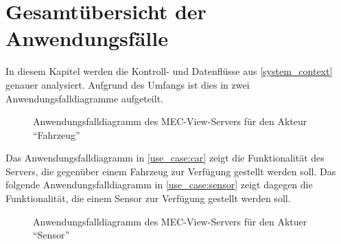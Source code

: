 \section{Gesamtübersicht der Anwendungsfälle}

In diesem Kapitel werden die Kontroll- und Datenflüsse aus \autoref{system_context} genauer analysiert.
Aufgrund des Umfangs ist dies in zwei Anwendungsfalldiagramme aufgeteilt.

\begin{figure}[H]
	\centering
	\caption{Anwendungsfalldiagramm des MEC-View-Servers für den Akteur \enquote{Fahrzeug}}
	\label{use_case:car}
\end{figure}

Das Anwendungsfalldiagramm in \autoref{use_case:car} zeigt die Funktionalität des Servers, die gegenüber einem Fahrzeug zur Verfügung gestellt werden soll.
Das folgende Anwendungsfalldiagramm in \autoref{use_case:sensor} zeigt dagegen die Funktionalität, die einem Sensor zur Verfügung gestellt werden soll.

\begin{figure}[H]
	\centering
	\caption{Anwendungsfalldiagramm des MEC-View-Servers für den Aktuer \enquote{Sensor}}
	\label{use_case:sensor}
\end{figure}


